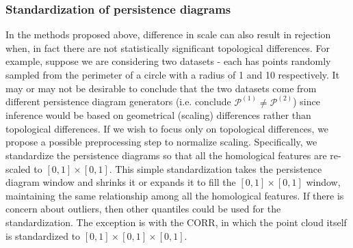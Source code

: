 \documentclass[12pt]{article}
\begin{document}




\subsubsection{Standardization of persistence diagrams} \label{sec:standardize}
In the methods proposed above, difference in scale can also result in rejection when, in fact there are not statistically significant topological differences. For example, suppose we are considering two datasets - each has points randomly sampled from the perimeter of a circle with a radius of 1 and 10 respectively. It may or may not be desirable to conclude that the two datasets come from different persistence diagram generators (i.e. conclude $\mathcal P^{(1)} \neq \mathcal P^{(2)}$) since inference would be based on geometrical (scaling) differences rather than topological differences. If we wish to focus only on topological differences, we propose a possible preprocessing step to normalize scaling. Specifically, we standardize the persistence diagrams so that all the homological features are re-scaled to $[0, 1]\times[0,1]$. This simple standardization takes the persistence diagram window and shrinks it or expands it to fill the $[0, 1]\times[0,1]$ window, maintaining the same relationship among all the homological features. If there is concern about outliers, then other quantiles could be used for the standardization. The exception is with the CORR, in which the point cloud itself is standardized to $[0, 1]\times[0, 1]\times[0, 1]$.
\end{document}
